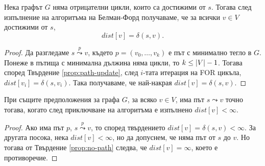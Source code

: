
\begin{prop}
  \label{prop:bellman-ford}
  Нека графът $G$ няма отрицателни цикли, които са достижими от $s$.
  Тогава след изпълнение на алгоритъма на Белман-Форд получаваме, че
  за всички $v \in V$ достижими от $s$, 
  \[dist[v] = \delta(s,v).\]
\end{prop}
\begin{proof}
  Да разгледаме $s \stackrel{p}{\leadsto} v$, където $p = (v_0,\dots,v_k)$ е път с минимално тегло в $G$.
  Понеже в пътища с минимална дължина няма цикли, то $k \leq \vert{V}\vert - 1$.
  Тогава според Твърдение \ref{prop:path-update}, 
  след $i$-тата итерация на FOR цикъла, $dist[v_i] = \delta(s,v_i)$.
  Така получаваме, че най-накрая $dist[v] = \delta(s,v)$.
\end{proof}
\begin{cor}
  \label{cor:bellman-ford}
  При същите предположения за графа $G$,
  за всяко $v \in V$, 
  има път $s \leadsto v$ точно тогава, когато след приключване на алгоритъма е изпълнено $dist[v] < \infty$.
\end{cor}
\begin{proof}
  Ако има път $p$, $s \stackrel{p}{\leadsto} v$, то
  според твърдението $dist[v] = \delta(s,v) < \infty$.
  За другата посока, нека $dist[v] < \infty$, но да допуснем, че няма път от $s$ до $v$.
  Но тогава от Твърдение \ref{prop:no-path} следва, че $dist[v]  = \infty$,
  което е противоречие.
\end{proof}


